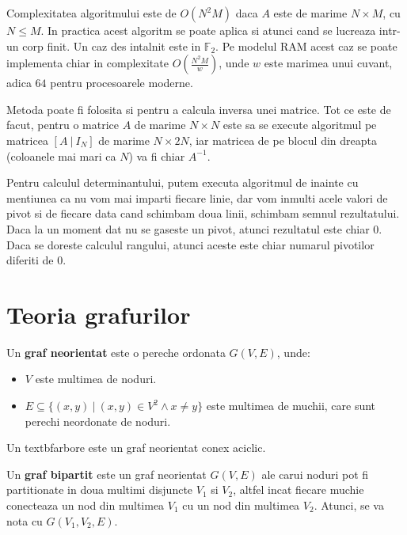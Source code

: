 Complexitatea algoritmului este de $O(N^{2}M)$ daca $A$ este de marime $N \times M$, cu $N \leq M$.
In practica acest algoritm se poate aplica si atunci cand se lucreaza intr-un corp finit.
Un caz des intalnit este in $\mathbb{F}_{2}$. Pe modelul RAM acest caz se poate implementa chiar in
complexitate $O(\frac{N^{2}M}{w})$, unde $w$ este marimea unui cuvant, adica $64$ pentru procesoarele
moderne.

Metoda poate fi folosita si pentru a calcula inversa unei matrice. Tot ce este de facut, pentru o matrice
$A$ de marime $N \times N$ este sa se execute algoritmul pe matricea $[A\ |\ I_{N}]$ de marime $N \times 2N$,
iar matricea de pe blocul din dreapta (coloanele mai mari ca $N$) va fi chiar $A^{-1}$.

Pentru calculul determinantului, putem executa algoritmul de inainte cu mentiunea ca nu vom mai imparti fiecare
linie, dar vom inmulti acele valori de pivot si de fiecare data cand schimbam doua linii, schimbam semnul
rezultatului. Daca la un moment dat nu se gaseste un pivot, atunci rezultatul este chiar $0$. Daca se
doreste calculul rangului, atunci aceste este chiar numarul pivotilor diferiti de $0$.

\pagebreak

\section{Teoria grafurilor}

\begin{defn}
  Un \textbf{graf neorientat} este o pereche ordonata $G(V, E)$, unde:
  \begin{itemize}
    \item{$V$ este multimea de noduri}.
    \item{$E \subseteq \{(x, y)\ |\ (x, y) \in V^2 \land x \neq y\}$ este
      multimea de muchii, care sunt perechi neordonate de noduri}.
  \end{itemize}
\end{defn}

\begin{defn}
  Un textbf{arbore} este un graf neorientat conex aciclic.
\end{defn}

\begin{defn}
  Un \textbf{graf bipartit} este un graf neorientat $G(V, E)$ ale carui noduri pot fi
  partitionate in doua multimi disjuncte $V_{1}$ si $V_{2}$, altfel incat fiecare muchie
  conecteaza un nod din multimea $V_{1}$ cu un nod din multimea $V_{2}$. Atunci,
  se va nota cu $G(V_{1}, V_{2}, E)$.
\end{defn}

